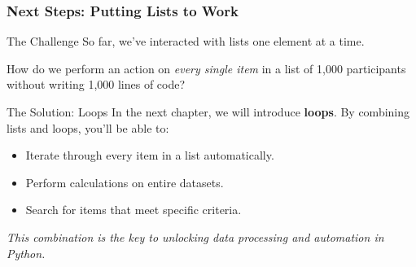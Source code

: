 \documentclass{beamer}
\begin{document}
\begin{frame}[fragile]
    \frametitle{Next Steps: Putting Lists to Work}
    
    \begin{block}{The Challenge}
        So far, we've interacted with lists one element at a time.
        \vspace{0.5em}
        
        How do we perform an action on \textit{every single item} in a list of 1,000 participants without writing 1,000 lines of code?
    \end{block}
    
    \pause
    
    \begin{alertblock}{The Solution: Loops}
        In the next chapter, we will introduce \textbf{loops}. By combining lists and loops, you'll be able to:
        \begin{itemize}
            \item Iterate through every item in a list automatically.
            \item Perform calculations on entire datasets.
            \item Search for items that meet specific criteria.
        \end{itemize}
    \end{alertblock}
    
    \vspace{1em}
    
    \centering
    \textit{This combination is the key to unlocking data processing and automation in Python.}
    
\end{frame}
\end{document}
